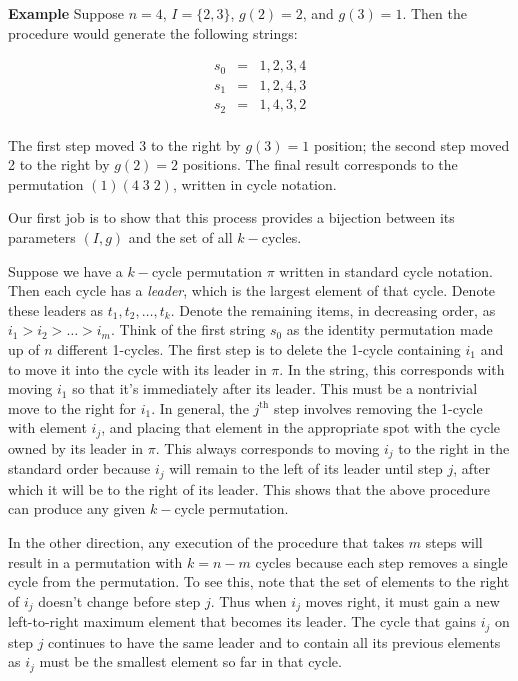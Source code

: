\documentclass[]{article}
\begin{document}
\textbf{Example} Suppose \(n=4\), \(I=\{2,3\}\), \(g(2) = 2\), and
\(g(3) = 1\). Then the procedure would generate the following strings:

\[
\begin{array}{rcl}
s_0 & = & 1, 2, 3, 4 \\
s_1 & = & 1, 2, 4, 3 \\
s_2 & = & 1, 4, 3, 2 \\
\end{array}
\]

The first step moved 3 to the right by \(g(3)=1\) position; the second
step moved 2 to the right by \(g(2)=2\) positions. The final result
corresponds to the permutation \((1) (4\; 3\; 2)\), written in cycle
notation.

Our first job is to show that this process provides a bijection between
its parameters \((I, g)\) and the set of all \(k-\)cycles.

Suppose we have a \(k-\)cycle permutation \(\pi\) written in standard
cycle notation. Then each cycle has a \emph{leader}, which is the
largest element of that cycle. Denote these leaders as
\(t_1, t_2, \ldots, t_k\). Denote the remaining items, in decreasing
order, as \(i_1 > i_2 > \ldots > i_m\). Think of the first string
\(s_0\) as the identity permutation made up of \(n\) different 1-cycles.
The first step is to delete the 1-cycle containing \(i_1\) and to move
it into the cycle with its leader in \(\pi\). In the string, this
corresponds with moving \(i_1\) so that it's immediately after its
leader. This must be a nontrivial move to the right for \(i_1\). In
general, the \(j^\text{th}\) step involves removing the 1-cycle with
element \(i_j\), and placing that element in the appropriate spot with
the cycle owned by its leader in \(\pi\). This always corresponds to
moving \(i_j\) to the right in the standard order because \(i_j\) will
remain to the left of its leader until step \(j\), after which it will
be to the right of its leader. This shows that the above procedure can
produce any given \(k-\)cycle permutation.

In the other direction, any execution of the procedure that takes \(m\)
steps will result in a permutation with \(k=n-m\) cycles because each
step removes a single cycle from the permutation. To see this, note that
the set of elements to the right of \(i_j\) doesn't change before step
\(j\). Thus when \(i_j\) moves right, it must gain a new left-to-right
maximum element that becomes its leader. The cycle that gains \(i_j\) on
step \(j\) continues to have the same leader and to contain all its
previous elements as \(i_j\) must be the smallest element so far in that
cycle.
\end{document}
